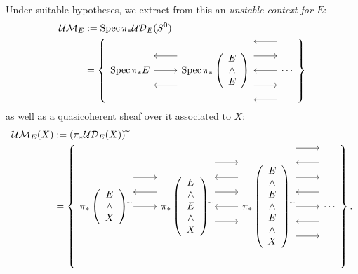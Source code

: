 \begin{definition}
Under suitable hypotheses, we extract from this an \textit{unstable context for $E$}:
\begin{align*}
\mathcal{UM}_E & := \Spec \pi_* \sheaf{UD}_E(S^0) \\
& = \left\{
\begin{tikzcd}[ampersand replacement=\&]
\Spec \pi_* E \arrow{r} \arrow[leftarrow,shift left=\baselineskip]{r}
\arrow[leftarrow,shift right=\baselineskip]{r}
\&
\Spec \pi_* \left( \begin{array}{c} E \\ \sm \\ E \end{array} \right)
\arrow[leftarrow, shift left=(2*\baselineskip)]{r} \arrow[shift left=\baselineskip]{r} \arrow[leftarrow]{r} \arrow[shift right=\baselineskip]{r} \arrow[leftarrow, shift right=(2*\baselineskip)]{r}
\&
\cdots
\end{tikzcd}
\right\}
\end{align*}
as well as a quasicoherent sheaf over it associated to $X$:
\begin{align*}
\sheaf{UM}_E(X) & := \left(\pi_* \sheaf{UD}_E(X)\right){\widetilde{}} \\
& = \left\{
\begin{tikzcd}[ampersand replacement=\&]
\pi_* \left( \begin{array}{c} E \\ \sm \\ X \end{array} \right)\widetilde{} \arrow[leftarrow, shift left=\baselineskip]{r} \arrow[shift left=(2*\baselineskip)]{r} \arrow{r} \&
\pi_* \left( \begin{array}{c} E \\ \sm \\ E \\ \sm \\ X \end{array} \right)\widetilde{} \arrow[shift left=(3*\baselineskip)]{r} \arrow[leftarrow, shift left=(2*\baselineskip)]{r} \arrow[shift left=\baselineskip]{r} \arrow[leftarrow]{r} \arrow[shift right=\baselineskip]{r} \&
\pi_* \left( \begin{array}{c} E \\ \sm \\ E \\ \sm \\ E \\ \sm \\ X \end{array} \right)\widetilde{} \arrow[shift left=(4*\baselineskip)]{r} \arrow[leftarrow, shift left=(3*\baselineskip)]{r} \arrow[shift left=(2*\baselineskip)]{r} \arrow[leftarrow, shift left=\baselineskip]{r} \arrow{r} \arrow[leftarrow, shift right=\baselineskip]{r} \arrow[shift right=(2*\baselineskip)]{r} \&
\cdots
\end{tikzcd}
\right\}.
\end{align*}
\end{definition}

